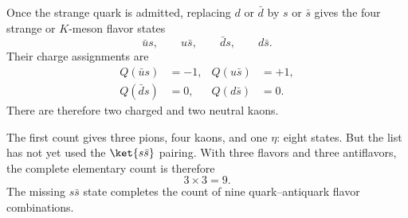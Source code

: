 \begin{classroomqa}
\end{classroomqa}

\begin{classroomqa}
\end{classroomqa}

Once the strange quark is admitted, replacing \(d\) or \(\bar d\) by \(s\) or \(\bar s\) gives the four strange or \(K\)-meson flavor states
\begin{equation}
\bar u s,\qquad u\bar s,\qquad \bar d s,\qquad d\bar s.
\end{equation}
Their charge assignments are
\begin{align}
Q(\bar u s) &=-1,
&
Q(u\bar s) &=+1,
\\
Q(\bar d s) &=0,
&
Q(d\bar s) &=0.
\end{align}
There are therefore two charged and two neutral kaons.

The first count gives three pions, four kaons, and one \(\eta\): eight states. But the list has not yet used the \(\ket{s\bar s}\) pairing. With three flavors and three antiflavors, the complete elementary count is therefore
\begin{equation}
3\times3=9.
\end{equation}
The missing \(s\bar s\) state completes the count of nine quark--antiquark flavor combinations.
